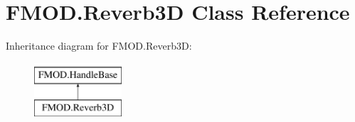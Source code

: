 \hypertarget{class_f_m_o_d_1_1_reverb3_d}{}\section{F\+M\+O\+D.\+Reverb3D Class Reference}
\label{class_f_m_o_d_1_1_reverb3_d}
Inheritance diagram for F\+M\+O\+D.\+Reverb3D\+:\begin{figure}[H]
\begin{center}
\leavevmode
\includegraphics[height=2.000000cm]{class_f_m_o_d_1_1_reverb3_d}
\end{center}
\end{figure}
